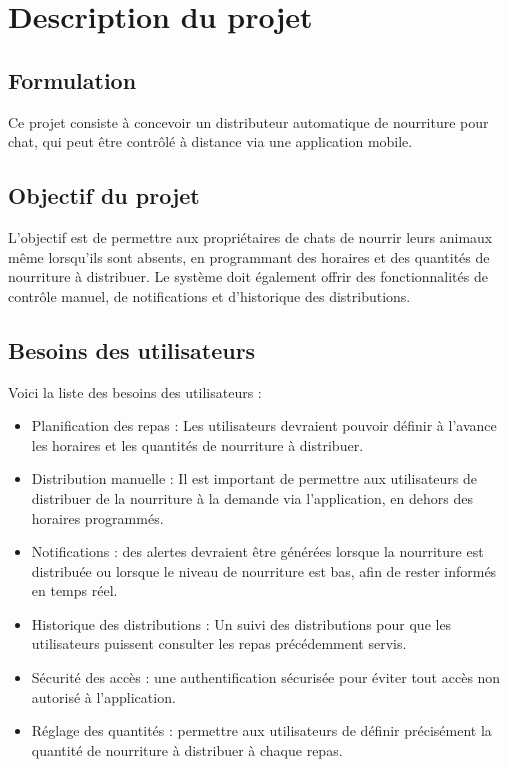 \chapter{Description du projet}
\section{Formulation}
Ce projet consiste à concevoir un distributeur automatique de nourriture pour chat, qui peut être contrôlé à distance via une application mobile. 
\section{Objectif du projet}
	L'objectif est de permettre aux propriétaires de chats de nourrir leurs animaux même lorsqu'ils sont absents, en programmant des horaires et des quantités de nourriture à distribuer. Le système doit également offrir des fonctionnalités de contrôle manuel, de notifications et d'historique des distributions.
\section{Besoins des utilisateurs}

Voici la liste des besoins des utilisateurs :

\begin{itemize}
	\item Planification des repas : Les utilisateurs devraient pouvoir définir à l'avance les horaires et les quantités de nourriture à distribuer.
	\item Distribution manuelle : Il est important de permettre aux utilisateurs de distribuer de la nourriture à la demande via l'application, en dehors des horaires programmés.
	\item Notifications : des alertes devraient être générées lorsque la nourriture est distribuée ou lorsque le niveau de nourriture est bas, afin de rester informés en temps réel.
	\item Historique des distributions : Un suivi des distributions pour que les utilisateurs puissent consulter les repas précédemment servis.
	\item Sécurité des accès : une authentification sécurisée pour éviter tout accès non autorisé à l'application.
	\item Réglage des quantités : permettre aux utilisateurs de définir précisément la quantité de nourriture à distribuer à chaque repas.
\end{itemize}
    
